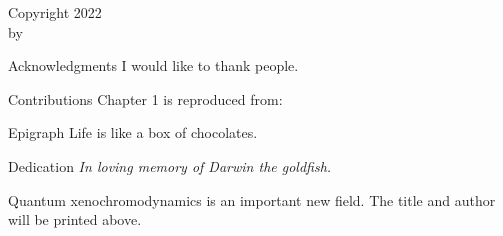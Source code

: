 
\ShowTitle

\begin{FrontCopyright}
\large
Copyright 2022\\[\bigskipamount] by\\[\bigskipamount] \GetAuthors
\end{FrontCopyright}

\begin{FrontChapter}{Acknowledgments}
I would like to thank people.
\end{FrontChapter}

\begin{FrontChapter}{Contributions}
Chapter 1 is reproduced from:\\[\smallskipamount]
\end{FrontChapter}

\begin{SpecialChapter}{Epigraph}
\large Life is like a box of chocolates.\\
\hrulefill
\end{SpecialChapter}

\begin{SpecialChapter}{Dedication}
\itshape In loving memory of Darwin the goldfish.
\end{SpecialChapter}

\begin{FrontAbstract}
Quantum xenochromodynamics is an important new field.
The title and author will be printed above.
\end{FrontAbstract}

\ShowTableOfContents
\ShowListOfFigures
\ShowListOfTables
\ShowListOfAbbrevs
